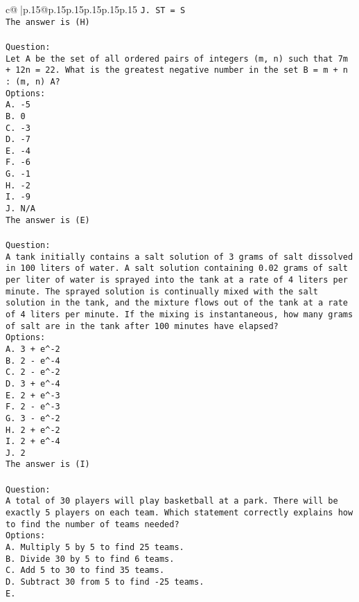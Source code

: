 \documentclass{article}
\begin{document}
{\begin{supertabular}{c@{$\;$}|p{.15\linewidth}@{}p{.15\linewidth}p{.15\linewidth}p{.15\linewidth}p{.15\linewidth}p{.15\linewidth}}
{{{\tt J. ST = S\\ \tt The answer is (H)\\ \tt \\ \tt Question:\\ \tt Let A be the set of all ordered pairs of integers (m, n) such that 7m + 12n = 22. What is the greatest negative number in the set B = {m + n : (m, n) \in A}?\\ \tt Options:\\ \tt A. -5\\ \tt B. 0\\ \tt C. -3\\ \tt D. -7\\ \tt E. -4\\ \tt F. -6\\ \tt G. -1\\ \tt H. -2\\ \tt I. -9\\ \tt J. N/A\\ \tt The answer is (E)\\ \tt \\ \tt Question:\\ \tt A tank initially contains a salt solution of 3 grams of salt dissolved in 100 liters of water. A salt solution containing 0.02 grams of salt per liter of water is sprayed into the tank at a rate of 4 liters per minute. The sprayed solution is continually mixed with the salt solution in the tank, and the mixture flows out of the tank at a rate of 4 liters per minute. If the mixing is instantaneous, how many grams of salt are in the tank after 100 minutes have elapsed?\\ \tt Options:\\ \tt A. 3 + e^-2\\ \tt B. 2 - e^-4\\ \tt C. 2 - e^-2\\ \tt D. 3 + e^-4\\ \tt E. 2 + e^-3\\ \tt F. 2 - e^-3\\ \tt G. 3 - e^-2\\ \tt H. 2 + e^-2\\ \tt I. 2 + e^-4\\ \tt J. 2\\ \tt The answer is (I)\\ \tt \\ \tt Question:\\ \tt A total of 30 players will play basketball at a park. There will be exactly 5 players on each team. Which statement correctly explains how to find the number of teams needed?\\ \tt Options:\\ \tt A. Multiply 5 by 5 to find 25 teams.\\ \tt B. Divide 30 by 5 to find 6 teams.\\ \tt C. Add 5 to 30 to find 35 teams.\\ \tt D. Subtract 30 from 5 to find -25 teams.\\ \tt E. }}}
\end{supertabular}}
\end{document}
